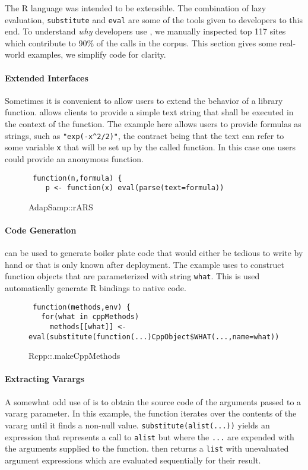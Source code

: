 \documentclass[screen,acmsmall]{acmart}%
\renewcommand{\k}[1]{\lstinline |#1|\xspace}
\begin{document}
The R language was intended to be extensible. The combination of lazy
evaluation, \k{substitute} and \k{eval} are some of the tools given to
developers to this end. To understand \emph{why} developers use \eval, we
manually inspected top 117 sites which contribute to 90\% of the calls in the
corpus. This section gives some real-world examples, we simplify code for
clarity.

\paragraph{Extended Interfaces}
Sometimes it is convenient to allow users to extend the behavior of a library
function. \Eval allows clients to provide a simple text string that shall be
executed in the context of the function. The example here allows users to
provide formulas as strings, such as \k{"exp(-x^2/2)"}, the contract being that
the text can refer to some variable \k{x} that will be set up by the called
function. In this case one users could provide an anonymous function.

\begin{figure}[h!]
\begin{lstlisting}
 function(n,formula) {
    p <- function(x) eval(parse(text=formula))
\end{lstlisting} \caption{AdapSamp::rARS}
\end{figure}

\paragraph{Code Generation}
\Eval can be used to generate boiler plate code that would either be tedious to
write by hand or that is only known after deployment. The example uses \eval to
construct function objects that are parameterized with string \k{what}.
This is used  automatically generate R bindings to native code.

\begin{figure}[h]
\begin{lstlisting}
 function(methods,env) {
   for(what in cppMethods)
     methods[[what]] <- eval(substitute(function(...)CppObject$WHAT(...,name=what)),env)
\end{lstlisting}
  \caption{Rcpp::.makeCppMethods}
\end{figure}

\paragraph{Extracting Varargs}
A somewhat odd use of \eval is to obtain the source code of the arguments passed
to a vararg parameter. In this example, the function iterates over the contents
of the vararg until it finds a non-null value. \k{substitute(alist(...))} yields
an expression that represents a call to \k{alist} but where the \k{...} are
expended with the arguments supplied to the function. \Eval then returns a
\k{list} with unevaluated argument expressions which are evaluated
sequentially for their result.
\end{document}
